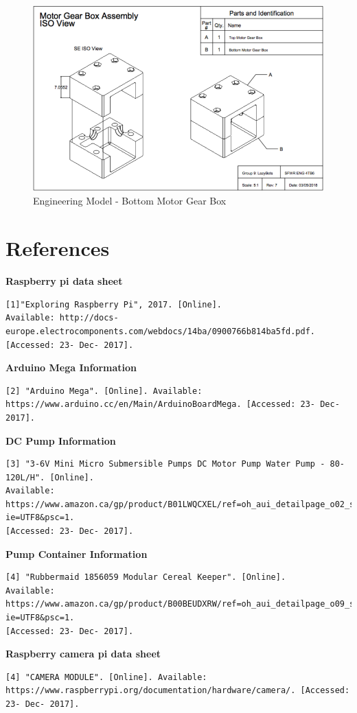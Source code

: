 \documentclass [10pt]{article}
\begin{document}
\begin{figure}[H]
	\centering
	\includegraphics [scale = 0.55] {figures/CAD_Motor_GB.png}
	\caption{Engineering Model - Bottom Motor Gear Box}
\end{figure}



\pagebreak

\section{References}

\textbf{Raspberry pi data sheet}
\begin{verbatim}
[1]"Exploring Raspberry Pi", 2017. [Online]. 
Available: http://docs-europe.electrocomponents.com/webdocs/14ba/0900766b814ba5fd.pdf. 
[Accessed: 23- Dec- 2017].
\end{verbatim}

\textbf{Arduino Mega Information}
\begin{verbatim}
[2] "Arduino Mega". [Online]. Available:
https://www.arduino.cc/en/Main/ArduinoBoardMega. [Accessed: 23- Dec- 2017].
\end{verbatim}

\textbf{DC Pump Information}
\begin{verbatim}
[3] "3-6V Mini Micro Submersible Pumps DC Motor Pump Water Pump - 80-120L/H". [Online]. 
Available: 
https://www.amazon.ca/gp/product/B01LWQCXEL/ref=oh_aui_detailpage_o02_s00?ie=UTF8&psc=1.
[Accessed: 23- Dec- 2017].
\end{verbatim}
\textbf{Pump Container Information}
\begin{verbatim}
[4] "Rubbermaid 1856059 Modular Cereal Keeper". [Online]. 
Available: 
https://www.amazon.ca/gp/product/B00BEUDXRW/ref=oh_aui_detailpage_o09_s00?ie=UTF8&psc=1. 
[Accessed: 23- Dec- 2017].
\end{verbatim}

\textbf{Raspberry camera pi data sheet}
\begin{verbatim}
[4] "CAMERA MODULE". [Online]. Available:
https://www.raspberrypi.org/documentation/hardware/camera/. [Accessed: 23- Dec- 2017].
\end{verbatim}
\end{document}
